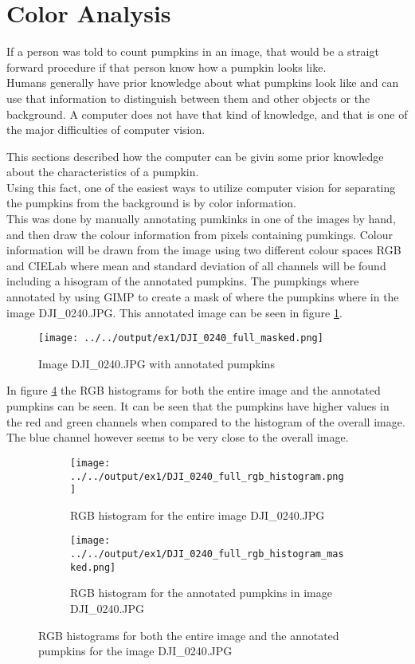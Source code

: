 \documentclass[../Head/Main.tex]{subfiles}
\begin{document}
\section{Color Analysis}

If a person was told to count pumpkins in an image, that would be a straigt forward procedure if that person know how a pumpkin looks like.\\
Humans generally have prior knowledge about what pumpkins look like and can use that information to distinguish between them and other objects or the background.
A computer does not have that kind of knowledge, and that is one of the major difficulties of computer vision.\par
This sections described how the computer can be givin some prior knowledge about the characteristics of a pumpkin.\\
Using this fact, one of the easiest ways to utilize computer vision for separating the pumpkins from the background is by color information.\\
This was done by manually annotating pumkinks in one of the images by hand, and then draw the colour information from pixels containing pumkings. Colour information will be drawn from the image using two different colour spaces RGB and CIELab where mean and standard deviation of all channels will be found including a hisogram of the annotated pumpkins. The pumpkings where annotated by using GIMP to create a mask of where the pumpkins where in the image DJI\_0240.JPG. This annotated image can be seen in figure \ref{fig:ann_pump}.
\begin{figure}[H]
	\centering
	\texttt{[image: ../../output/ex1/DJI\_0240\_full\_masked.png]}
	\caption{Image DJI\_0240.JPG with annotated pumpkins}
	\label{fig:ann_pump}
\end{figure}

In figure \ref{fig:rgb_hist} the RGB histograms for both the entire image and the annotated pumpkins can be seen. It can be seen that the pumpkins have higher values in the red and green channels when compared to the histogram of the overall image. The blue channel however seems to be very close to the overall image.
\begin{figure}[H]
	\centering
	\begin{subfigure}{0.49\textwidth}
		\centering
		\texttt{[image: ../../output/ex1/DJI\_0240\_full\_rgb\_histogram.png]}
		\caption{RGB histogram for the entire image DJI\_0240.JPG}
		\label{fig:rgb_hist_full}	
	\end{subfigure}
	\begin{subfigure}{0.49\textwidth}
		\centering
		\texttt{[image: ../../output/ex1/DJI\_0240\_full\_rgb\_histogram\_masked.png]}
		\caption{RGB histogram for the annotated pumpkins in image DJI\_0240.JPG}
		\label{fig:rgb_hist_masked}
	\end{subfigure}
	\caption{RGB histograms for both the entire image and the annotated pumpkins for the image DJI\_0240.JPG}
	\label{fig:rgb_hist}
\end{figure}
\end{document}
